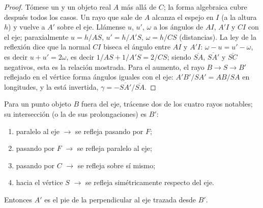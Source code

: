 \begin{proof}
Tómese un  y un objeto real $A$ más allá de $C$; la forma
algebraica cubre después todos los casos. Un rayo que sale de $A$ alcanza
el espejo en $I$ (a la altura $h$) y vuelve a $A'$ sobre el eje. Llámense
$u$, $u'$, $\omega$ a los ángulos de $AI$, $A'I$ y $CI$ con el eje;
paraxialmente $u = h/AS$, $u' = h/A'S$, $\omega = h/CS$ (distancias). La
ley de la reflexión dice que la normal $CI$ biseca el ángulo entre $AI$ y
$A'I$: $\omega - u = u' - \omega$, es decir $u + u' = 2\omega$, es decir
$1/AS + 1/A'S = 2/CS$; siendo $\overline{SA}$, $\overline{SA'}$ y
$\overline{SC}$ negativos, esta es la relación mostrada. Para el aumento,
el rayo $B \to S \to B'$ reflejado en el vértice forma ángulos iguales con
el eje: $A'B'/SA' = AB/SA$ en longitudes, y la  está invertida,
$\gamma = -\overline{SA'}/\overline{SA}$.
\end{proof}

\begin{method}\label{met:b1:mirrors-thin-lenses:mirrorrays}
Para un punto objeto $B$ fuera del eje, trácense dos de los cuatro rayos
notables; su intersección (o la de sus prolongaciones) es $B'$:
\begin{enumerate}
  \item paralelo al eje $\to$ se refleja pasando por $F$;
  \item pasando por $F$ $\to$ se refleja paralelo al eje;
  \item pasando por $C$ $\to$ se refleja sobre sí mismo;
  \item hacia el vértice $S$ $\to$ se refleja simétricamente respecto del eje.
\end{enumerate}
Entonces $A'$ es el pie de la perpendicular al eje trazada desde $B'$.
\end{method}

